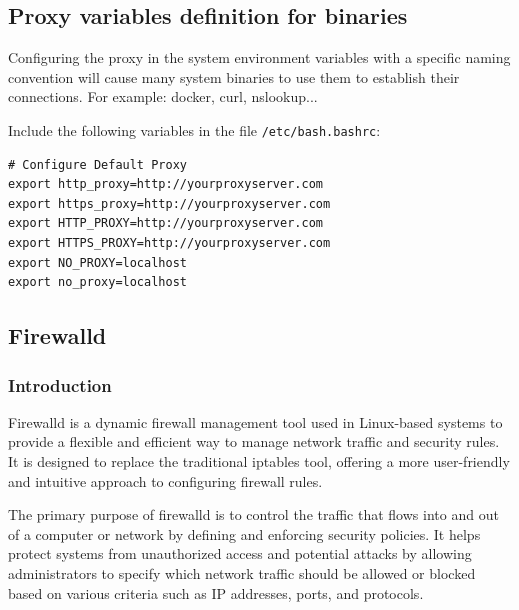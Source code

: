\documentclass{article}
\newenvironment{codetemplate}[1][]{%
  \mybasecolorbox[#1]
  \itshape
}{%
  \endmybasecolorbox
}
\begin{document}
\subsection{Proxy variables definition for binaries}
Configuring the proxy in the system environment variables with a specific naming convention will cause many system binaries to use them to establish their connections. For example: docker, curl, nslookup...

Include the following variables in the file \verb|/etc/bash.bashrc|:\begin{codetemplate}{}
\begin{verbatim}
# Configure Default Proxy
export http_proxy=http://yourproxyserver.com
export https_proxy=http://yourproxyserver.com
export HTTP_PROXY=http://yourproxyserver.com
export HTTPS_PROXY=http://yourproxyserver.com
export NO_PROXY=localhost
export no_proxy=localhost
\end{verbatim}
\end{codetemplate}

\subsection{Firewalld}

\subsubsection{Introduction}
Firewalld is a dynamic firewall management tool used in Linux-based systems to provide a flexible and efficient way to manage network traffic and security rules. It is designed to replace the traditional iptables tool, offering a more user-friendly and intuitive approach to configuring firewall rules.

The primary purpose of firewalld is to control the traffic that flows into and out of a computer or network by defining and enforcing security policies. It helps protect systems from unauthorized access and potential attacks by allowing administrators to specify which network traffic should be allowed or blocked based on various criteria such as IP addresses, ports, and protocols.
\end{document}
